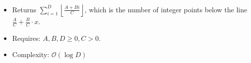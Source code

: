\begin{itemize}
	\item Returns $\sum\limits_{i = 1}^{D}\left\lfloor\frac{A + Bi}{C}\right\rfloor$, which is the number of integer points below the line $\frac{A}{C}+\frac{B}{C}\cdot x$.
  \item Requires: $A,B,D \geq 0, C > 0$.
  \item Complexity: $\mathcal{O}(\log D)$
\end{itemize}